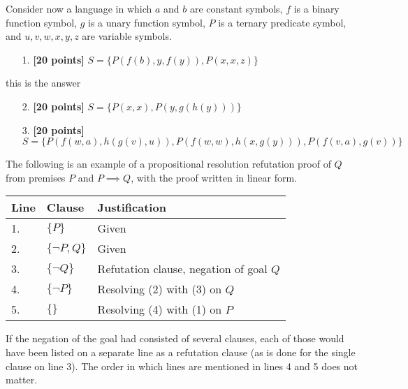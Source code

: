 \documentclass{article}
\begin{document}
Consider now a language in which $a$ and $b$ are constant symbols, $f$
is a binary function symbol, $g$ is a unary function symbol, $P$ is a
ternary predicate symbol, and $u,v,w,x,y,z$ are variable symbols.

\begin{enumerate}
\item[1.] \textbf{[20 points]} $S = \{ P(f(b),y,f(y)), P(x,x,z) \}$
\end{enumerate}
\begin{answer}
  this is the answer
\end{answer}
\begin{enumerate}
\item[2.] \textbf{[20 points]} $S = \{ P(x,x), P(y,g(h(y))) \}$
\end{enumerate}

\begin{enumerate}
\item[3.] \textbf{[20 points]}
  $S = \{ P(f(w,a),h(g(v),u)), P(f(w,w),h(x,g(y))), P(f(v,a),g(v)) \}$
\end{enumerate}

\newpage

The following is an example of a propositional resolution refutation
proof of $Q$ from premises $P$ and $P \implies Q$, with the proof
written in linear form.
\begin{center}
  \begin{tabular}{lll}
    Line & Clause & Justification \\ \hline
    1. & $\{ P \}$ & Given \\
    2. & $\{ \neg P, Q \}$ & Given \\ \hline
    3. & $\{ \neg Q \}$ & Refutation clause, negation of goal $Q$ \\
    4. & $\{ \neg P \}$ & Resolving (2) with (3) on $Q$  \\
    5. & $\{ \}$ & Resolving (4) with (1) on $P$  \\ 
  \end{tabular}
\end{center}
If the negation of the goal had consisted of several clauses, each of
those would have been listed on a separate line as a refutation clause
(as is done for the single clause on line 3).  The order in which
lines are mentioned in lines 4 and 5 does not matter.
\end{document}
